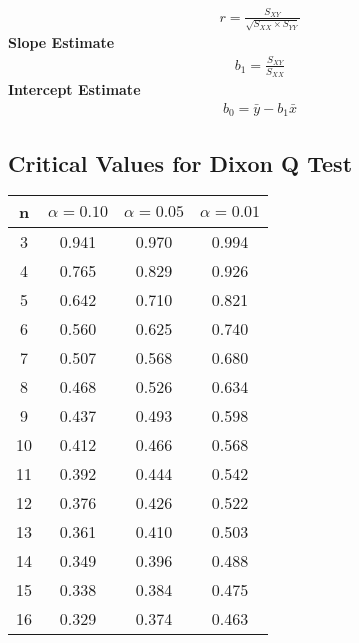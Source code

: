 \documentclass[a4paper,12pt]{article}
\begin{document}
\begin{eqnarray*}
	r = \frac{S_{XY}}{\sqrt{S_{XX} \times S_{YY}}}
\end{eqnarray*}
{\bf Slope Estimate}
\begin{eqnarray*}
	b_1 = \frac{S_{XY}}{S_{XX}}
\end{eqnarray*}
{\bf Intercept Estimate}
\begin{eqnarray*}
	b_0 = \bar{y} -b_1\bar{x}
\end{eqnarray*}

%
\newpage
\subsection*{Critical Values for Dixon Q Test}
{
	\Large
	\begin{center}
		\begin{tabular}{|c|c|c|c|}
			\hline  n  & $\alpha=0.10$  & $\alpha=0.05$  & $\alpha=0.01$  \\ \hline
			3  & 0.941 & 0.970  & 0.994 \\ \hline
			4  & 0.765 & 0.829 & 0.926 \\ \hline
			5  & 0.642 & 0.710  & 0.821 \\ \hline
			6  & 0.560  & 0.625 & 0.740  \\ \hline
			7  & 0.507 & 0.568 & 0.680  \\ \hline
			8  & 0.468 & 0.526 & 0.634 \\ \hline
			9  & 0.437 & 0.493 & 0.598 \\ \hline
			10 & 0.412 & 0.466 & 0.568 \\ \hline
			11 & 0.392 & 0.444 & 0.542 \\ \hline
			12 & 0.376 & 0.426 & 0.522 \\ \hline
			13 & 0.361 & 0.410  & 0.503 \\ \hline
			14 & 0.349 & 0.396 & 0.488 \\ \hline
			15 & 0.338 & 0.384 & 0.475 \\ \hline
			16 & 0.329 & 0.374 & 0.463 \\ \hline
		\end{tabular} 
	\end{center}
}



%
\newpage
\end{document}
